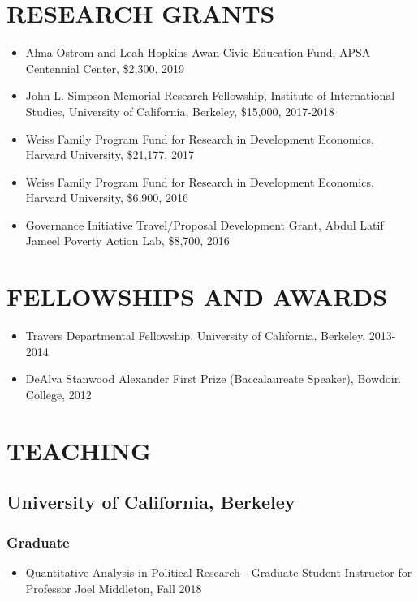 \documentclass[11pt]{article}
\begin{document}
\vspace{3mm}
\section*{RESEARCH GRANTS}
\begin{itemize}
\item[]Alma Ostrom and Leah Hopkins Awan Civic Education Fund, APSA Centennial Center, \$2,300, 2019
\item[]John L. Simpson Memorial Research Fellowship, Institute of International Studies, University of California, Berkeley, \$15,000, 2017-2018
\item[] Weiss Family Program Fund for Research in Development Economics, Harvard University, \$21,177, 2017
\item[] Weiss Family Program Fund for Research in Development Economics, Harvard University, \$6,900, 2016
\item[] Governance Initiative Travel/Proposal Development Grant, Abdul Latif Jameel Poverty Action Lab, \$8,700, 2016	
	 
	
\end{itemize}

\vspace{3mm}
\section*{FELLOWSHIPS AND AWARDS} 
\begin{itemize}
	
	\item[]Travers Departmental Fellowship, University of California, Berkeley, 2013-2014
	\item[]DeAlva Stanwood Alexander First Prize (Baccalaureate Speaker), Bowdoin College, 2012
\end{itemize}
\vspace{3mm}
\section*{TEACHING}


\subsection*{University of California, Berkeley}
\subsubsection*{Graduate}
\begin{itemize}
	\item[]Quantitative Analysis in Political Research - Graduate Student Instructor for Professor Joel Middleton, Fall 2018 
\end{itemize}
\end{document}
